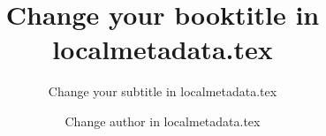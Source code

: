\title{Change your booktitle in localmetadata.tex}  %
\subtitle{Change your subtitle in localmetadata.tex}
\author{Change author in localmetadata.tex}
\renewcommand{\lsISBNdigital}{000-0-000000-00-0}
\renewcommand{\lsISBNhardcover}{000-0-000000-00-0}
\renewcommand{\lsISBNsoftcover}{000-0-000000-00-0}
\renewcommand{\lsSeries}{classics} %
